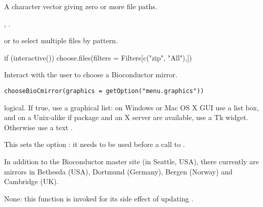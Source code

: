 %
\begin{Value}
A character vector giving zero or more file paths.
\end{Value}
%
\begin{SeeAlso}\relax
{}, .

 or  to select multiple
files by pattern.
\end{SeeAlso}
%
\begin{Examples}
\begin{ExampleCode}
  if (interactive()) 
       choose.files(filters = Filters[c("zip", "All"),])
\end{ExampleCode}
\end{Examples}
%
\begin{Description}\relax
Interact with the user to choose a Bioconductor mirror.
\end{Description}
%
\begin{Usage}
\begin{verbatim}
chooseBioCmirror(graphics = getOption("menu.graphics"))
\end{verbatim}
\end{Usage}
%
\begin{Arguments}
\begin{ldescription}
\item[\code{graphics}] logical.  If true, use a graphical list: on Windows or
Mac OS X GUI use a list box, and on a Unix-alike if package
 and an X server are available, use a Tk
widget.  Otherwise use a text .
\end{ldescription}
\end{Arguments}
%
\begin{Details}\relax
This sets the option : it needs to be used before
a call to .

In addition to the Bioconductor master site (in Seattle, USA), there
currently are mirrors in Bethesda (USA), Dortmund (Germany), Bergen
(Norway) and Cambridge (UK).
\end{Details}
%
\begin{Value}
None: this function is invoked for its
side effect of updating .
\end{Value}
